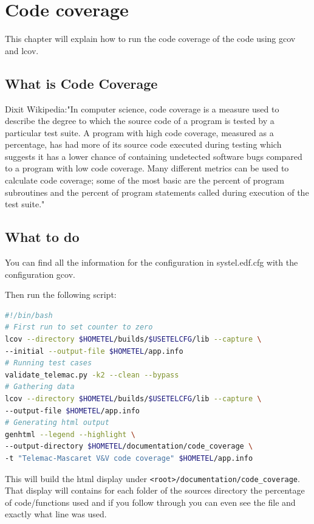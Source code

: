 %
\chapter{Code coverage}
%
This chapter will explain how to run the code coverage of the code using gcov and lcov.
%
%
\section{What is Code Coverage}
%
%
Dixit Wikipedia:"In computer science, code coverage is a measure used to
describe the degree to which the source code of a program is tested by a
particular test suite. A program with high code coverage, measured as a
percentage, has had more of its source code executed during testing which
suggests it has a lower chance of containing undetected software bugs compared
to a program with low code coverage. Many different metrics can be used to
calculate code coverage; some of the most basic are the percent of program
subroutines and the percent of program statements called during execution of
the test suite."
%
%
\section{What to do}
%
%
You can find all the information for the configuration in systel.edf.cfg with
the configuration gcov.

Then run the following script:
\begin{lstlisting}[language=bash]
#!/bin/bash
# First run to set counter to zero
lcov --directory $HOMETEL/builds/$USETELCFG/lib --capture \
--initial --output-file $HOMETEL/app.info
# Running test cases
validate_telemac.py -k2 --clean --bypass
# Gathering data
lcov --directory $HOMETEL/builds/$USETELCFG/lib --capture \
--output-file $HOMETEL/app.info
# Generating html output
genhtml --legend --highlight \
--output-directory $HOMETEL/documentation/code_coverage \
-t "Telemac-Mascaret V&V code coverage" $HOMETEL/app.info
\end{lstlisting}

This will build the html display under
\verb!<root>/documentation/code_coverage!. That display will contains for each
folder of the sources directory the percentage of code/functions used and if
you follow through you can even see the file and exactly what line was used.

